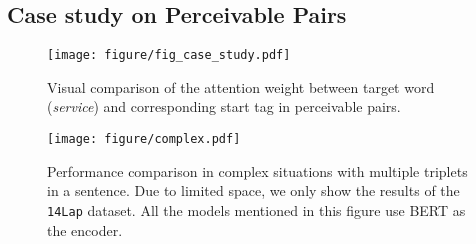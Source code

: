 \documentclass[11pt]{article}
\begin{document}
\subsection{Case study on Perceivable Pairs}
\begin{figure}[t]
    \centering
    \texttt{[image: figure/fig\_case\_study.pdf]}
    \caption{Visual comparison of the attention weight between target word (\textit{service}) and corresponding start tag in perceivable pairs. }
    \label{fig:case_study}
\end{figure}
\begin{figure}[t]
    \centering
    \texttt{[image: figure/complex.pdf]}
    \caption{Performance comparison in complex situations with multiple triplets in a sentence. Due to limited space, we only show the results of the \texttt{14Lap} dataset. All the models mentioned in this figure use BERT as the encoder.}
    \label{fig:data_complex}
\end{figure}
\end{document}
